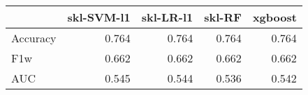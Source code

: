 \begin{tabular}{lrrrr}
\toprule
{} &  skl-SVM-l1 &  skl-LR-l1 &  skl-RF &  xgboost \\
\midrule
Accuracy &       0.764 &      0.764 &   0.764 &    0.764 \\
F1w      &       0.662 &      0.662 &   0.662 &    0.662 \\
AUC      &       0.545 &      0.544 &   0.536 &    0.542 \\
\bottomrule
\end{tabular}
